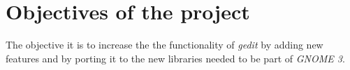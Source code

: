 
\chapter{Objectives of the project}


The objective it is to increase the the functionality of \emph{gedit} by adding new features and by porting it to the new libraries needed to be part of \emph{GNOME 3}.



